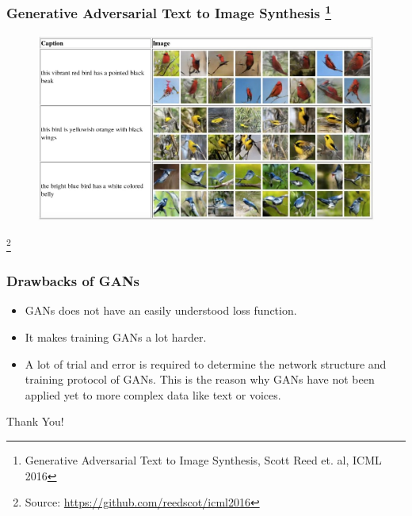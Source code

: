 \documentclass{beamer}
\begin{document}
\begin{frame}
    \frametitle{Generative Adversarial Text to Image Synthesis 
    \footnote{Generative Adversarial Text to Image Synthesis, Scott Reed et. al, ICML 2016}}
    \begin{center}
        \begin{figure}
            \includegraphics[width=\textwidth]{images/stackgan.jpg}
        \end{figure}
    \end{center}
    \footnote{Source: \url{https://github.com/reedscot/icml2016}}
\end{frame}

\begin{frame}
    \frametitle{Drawbacks of GANs}
    \begin{itemize}
        \item {GANs does not have an easily understood loss function.}
        \pause \item {It makes training GANs a lot harder.}
        \pause \item {A lot of trial and error is required to determine the network 
        structure and training protocol of GANs. This is the reason why GANs 
        have not been applied yet to more complex data like text or voices.}
    \end{itemize}
\end{frame}

\begin{frame}
    \begin{center}
        \LARGE{Thank You!}
    \end{center}
\end{frame}
\end{document}
